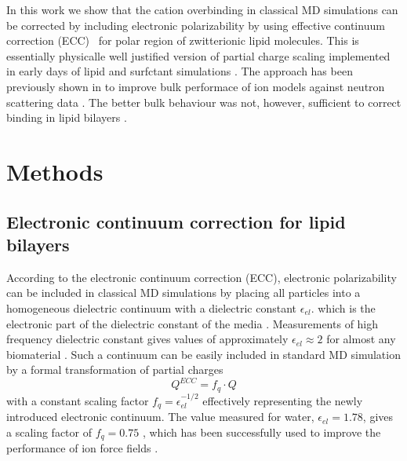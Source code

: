 \documentclass[aip,jcp,twocolumn]{revtex4}
\begin{document}
In this work we show that the cation overbinding in classical MD simulations
can be corrected by including electronic polarizability by using effective continuum
correction (ECC)~\cite{leontyev11} for polar region of zwitterionic lipid molecules.
This is essentially physicalle well justified version of partial charge scaling
implemented in early days of lipid and surfctant simulations \cite{jonsson86,egberts94}. 
The approach has been previously shown in to improve bulk performace of
ion models against neutron scattering data \cite{Jungwirth2015,kohagen14,kohagen16}.
The better bulk behaviour was not, however, sufficient to correct binding in lipid
bilayers \cite{catte16}. 




\section{Methods}

\subsection{Electronic continuum correction for lipid bilayers}
According to the electronic continuum correction (ECC)\cite{leontyev11}, electronic
polarizability can be included in classical MD simulations by
placing all particles into a homogeneous dielectric continuum 
with a dielectric constant $\epsilon _{el}$. 
which is the electronic part of the dielectric constant of 
the media \cite{leontyev11}. Measurements of high frequency 
dielectric constant gives values of approximately $\epsilon _{el} \approx 2$ 
for almost any biomaterial \cite{some_original_work, leontyev11}. %
Such a continuum can be easily included in standard MD simulation by
a formal transformation of partial charges 
\begin{equation}
  Q^{ECC} = f_q \cdot Q
\end{equation}
with a constant scaling factor $f_q = \epsilon _{el} ^{-1/2}$ 
effectively representing the newly introduced electronic continuum. 
The value measured for water, $\epsilon _{el} = 1.78$, gives 
a scaling factor of $f_q = 0.75$ \cite{some_orig_source, leontyev11}, which has been
successfully used to improve the performance of ion force fields \cite{kohagen14,kohagen16,??}. 
\end{document}

